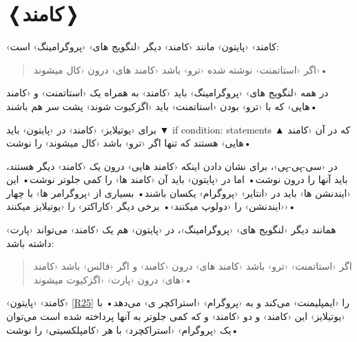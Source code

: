 \documentclass[openany, twocolumn]{book}
\begin{document}
\section{❬کامند❭ \label{R29}}
‹کامند›  ‹پایتون› مانند ‹کامند›  دیگر ‹لنگویج های› ‹پروگرامینگ› است:
\begin{quotation}
اگر ‹استاتمنت› نوشته شده ‹ترو› باشد ‹کامند های› درون  ‹کال میشوند›•
\end{quotation}
در همه ‹لنگویج های› ‹پروگرامینگ› باید ‹کامند›  به همراه یک ‹استاتمنت› و ‹کامند هایی› که با ‹ترو› بودن ‹استاتمنت› باید ‹اگزکیوت شوند› پشت سر هم باشند•

\begin{Usage}
برای ‹یوتیلایز› ‹کامند›  در ‹پایتون› باید 
▼
if condition:
	statements
▲
 که در آن  ‹کامند هایی› هستند که تنها اگر  ‹ترو› باشد ‹کال میشوند› را نوشت•
\end{Usage}

در ‹سی-پی-پی›، برای نشان دادن اینکه ‹کامند هایی› درون یک ‹کامند› دیگر هستند، باید آنها را درون \code{\{\}} نوشت• اما در ‹پایتون› باید آن ‹کامند ها› را کمی جلو‌تر نوشت• این ‹ایندنشن ها› باید در ‹انتایر› ‹پروگرام› یکسان باشند• بسیاری از ‹پروگرامر ها› با چهار \likestring{ } ‹ایندنشن› را ‹دولوپ میکنند›• برخی دیگر ‹کاراکتر›  را ‹یوتیلایز میکنند›•

همانند دیگر ‹لنگویج های› ‹پروگرامینگ›، در ‹پایتون› هم یک ‹کامند›  می‌تواند ‹پارت›  داشته باشد:
\begin{quotation}
اگر ‹استاتمنت› ‹ترو› باشد ‹کامند های› درون ‹کامند›  و اگر ‹فالس› باشد ‹کامند های› درون ‹پارت›  ‹اگزکیوت میشوند›•
\end{quotation}
‹کامند›  ‹پایتون› \ref{R25} را ‹ایمپلیمنت› می‌کند و به ‹پروگرام› ‹استراکچر ی› می‌دهد• با ‹یوتیلایز› این ‹کامند› و دو ‹کامند›  و  که کمی جلو‌تر به آنها پرداخته شده است می‌توان یک ‹پروگرام› ‹استراکچرد› با هر ‹کامپلکسیتی› را نوشت•
\end{document}
